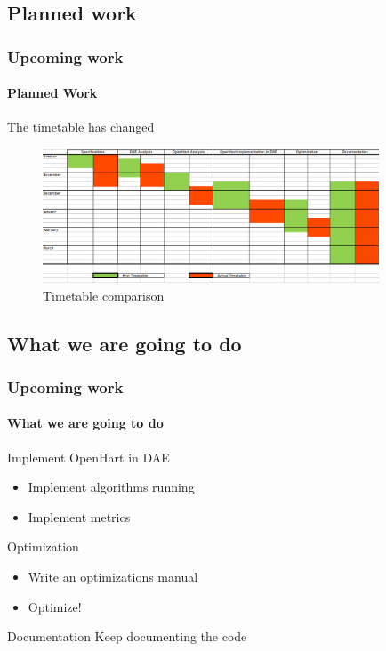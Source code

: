 \documentclass[c]{beamer}
\begin{document}
\subsection{Planned work}
\begin{frame}
\frametitle{Upcoming work}
\framesubtitle{Planned Work}
The timetable has changed
  \begin{figure}
  \begin{center}
    \includegraphics[width=10cm]{planning.png}
	\newline
	Timetable comparison
  \end{center}
  \end{figure}
\end{frame}

\subsection{What we are going to do}

\begin{frame}
\frametitle{Upcoming work}
\framesubtitle{What we are going to do}
\begin{block}{Implement OpenHart in DAE}
\begin{itemize}
	\item Implement algorithms running
	\item Implement metrics
\end{itemize}
\end{block}

\begin{block}{Optimization}
	\begin{itemize}
	\item Write an optimizations manual
	\item Optimize!
	\end{itemize}
\end{block}

\begin{block}{Documentation}
Keep documenting the code
\end{block}
\end{frame}
\end{document}
